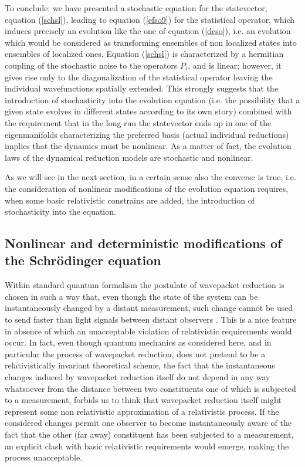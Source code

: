 \documentclass[10pt,a4paper]{article}
\begin{document}
To conclude: we have presented a stochastic equation for the
statevector, equation (\ref{schsl}), leading to equation
(\ref{efso9}) for the statistical operator, which induces
precisely an evolution like the one of equation (\ref{deso}), i.e.
an evolution which would be considered as transforming ensembles
of non localized states into ensembles of localized ones. Equation
(\ref{schsl}) is characterized by a hermitian coupling of the
stochastic noise to the operators $P_{i}$, and is linear; however,
it gives rise only to the diagonalization of the statistical
operator leaving the individual wavefunctions spatially extended.
This strongly suggests that the introduction of stochasticity into
the evolution equation (i.e. the possibility that a given state
evolves in different states according to its own story) combined
with the requirement that in the long run the statevector ends up
in one of the eigenmanifolds characterizing the preferred basis
(actual individual reductions) implies that the dynamics must be
nonlinear. As a matter of fact, the evolution laws of the
dynamical reduction models are stochastic and nonlinear.

As we will see in the next section, in a certain sense also the
converse is true, i.e. the consideration of nonlinear
modifications of the evolution equation requires, when some basic
relativistic constrains are added, the introduction of
stochasticity into the equation.



\subsection[Nonlinear and deterministic modifications]{Nonlinear
and deterministic modifications of the Schr\"o\-din\-ger equation}
\label{sec43}


Within standard quantum formalism the postulate of wavepacket
reduction is chosen in such a way that, even though the state of
the system can be instantaneously changed by a distant
measurement, such change cannot be used to send faster than light
signals between distant observers \cite{heb,grwfl,gwfl,shi1}. This
is a nice feature in absence of which an unacceptable violation of
relativistic requirements would occur. In fact, even though
quantum mechanics as considered here, and in particular the
process of wavepacket reduction, does not pretend to be a
relativistically invariant theoretical scheme, the fact that the
instantaneous changes induced by wavepacket reduction itself do
not depend in any way whatsoever from the distance between two
constituents one of which is subjected to a measurement, forbids
us to think that wavepacket reduction itself might represent some
non relativistic approximation of a relativistic process. If the
considered changes permit  one observer to become instantaneously
aware of the fact that the other (far away) constituent has been
subjected to a measurement, an explicit clash with basic
relativistic requirements would emerge, making the process
unacceptable.
\end{document}
